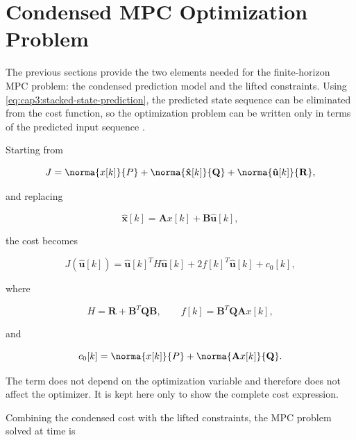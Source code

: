 \section{Condensed MPC Optimization Problem}

The previous sections provide the two elements needed for the finite-horizon MPC problem: the condensed prediction model and the lifted constraints. Using \eqref{eq:cap3:stacked-state-prediction}, the predicted state sequence can be eliminated from the cost function, so the optimization problem can be written only in terms of the predicted input sequence .

Starting from

\noindent
\begin{equation}
	J = \norma{x[k]}{P} + \norma{\mathbf{\hat{x}}[k]}{\mathbf{Q}} + \norma{\mathbf{\hat{u}}[k]}{\mathbf{R}},
\end{equation}

\noindent
and replacing

\noindent
\begin{equation}
	\mathbf{\hat{x}}[k] = \mathbf{A}x[k] + \mathbf{B}\mathbf{\hat{u}}[k],
\end{equation}

\noindent
the cost becomes

\noindent
\begin{equation}
	J(\mathbf{\hat{u}}[k]) =
	\mathbf{\hat{u}}[k]^T H \mathbf{\hat{u}}[k]
	+ 2 f[k]^T \mathbf{\hat{u}}[k]
	+ c_0[k],
\end{equation}

\noindent
where

\noindent
\begin{equation}
	H = \mathbf{R} + \mathbf{B}^T \mathbf{Q} \mathbf{B},
	\qquad
	f[k] = \mathbf{B}^T \mathbf{Q} \mathbf{A}x[k],
\end{equation}

\noindent
and

\noindent
\begin{equation}
	c_0[k] = \norma{x[k]}{P} + \norma{\mathbf{A}x[k]}{\mathbf{Q}}.
\end{equation}

The term  does not depend on the optimization variable and therefore does not affect the optimizer. It is kept here only to show the complete cost expression.

Combining the condensed cost with the lifted constraints, the MPC problem solved at time  is

